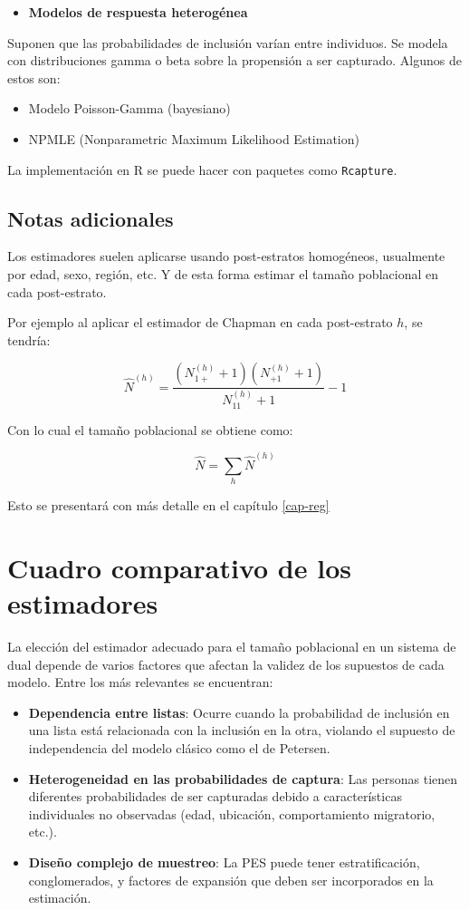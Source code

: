 \documentclass[
  12pt,
]{book}
\providecommand{\tightlist}{%
  \setlength{\itemsep}{0pt}\setlength{\parskip}{0pt}}
\begin{document}
\begin{itemize}
\tightlist
\item
  \textbf{Modelos de respuesta heterogénea}
\end{itemize}

Suponen que las probabilidades de inclusión varían entre individuos. Se modela con distribuciones gamma o beta sobre la propensión a ser capturado. Algunos de estos son:

\begin{itemize}
\tightlist
\item
  Modelo Poisson-Gamma (bayesiano)
\item
  NPMLE (Nonparametric Maximum Likelihood Estimation)
\end{itemize}

La implementación en R se puede hacer con paquetes como \texttt{Rcapture}.

\subsection{Notas adicionales}\label{notas-adicionales}

Los estimadores suelen aplicarse usando post-estratos homogéneos, usualmente por edad, sexo, región, etc. Y de esta forma estimar el tamaño poblacional en cada post-estrato.

Por ejemplo al aplicar el estimador de Chapman en cada post-estrato \(h\), se tendría:

\[\hat{N}^{(h)} = \frac{(N_{1+}^{(h)} + 1)(N_{+1}^{(h)} + 1)}{N_{11}^{(h)} + 1} - 1\]

Con lo cual el tamaño poblacional se obtiene como:

\[\hat{N} = \sum_{h} \hat{N}^{(h)}\]

Esto se presentará con más detalle en el capítulo \ref{cap-reg}

\section{Cuadro comparativo de los estimadores}\label{cuadro-comparativo-de-los-estimadores}

La elección del estimador adecuado para el tamaño poblacional en un sistema de dual depende de varios factores que afectan la validez de los supuestos de cada modelo. Entre los más relevantes se encuentran:

\begin{itemize}
\tightlist
\item
  \textbf{Dependencia entre listas}: Ocurre cuando la probabilidad de inclusión en una lista está relacionada con la inclusión en la otra, violando el supuesto de independencia del modelo clásico como el de Petersen.
\item
  \textbf{Heterogeneidad en las probabilidades de captura}: Las personas tienen diferentes probabilidades de ser capturadas debido a características individuales no observadas (edad, ubicación, comportamiento migratorio, etc.).
\item
  \textbf{Diseño complejo de muestreo}: La PES puede tener estratificación, conglomerados, y factores de expansión que deben ser incorporados en la estimación.
\end{itemize}
\end{document}
